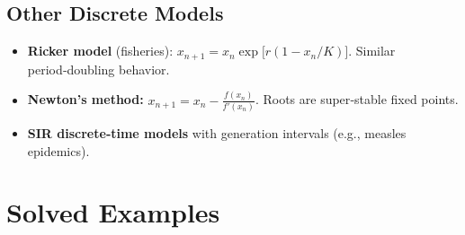 \documentclass[12pt,a4paper]{book}
\begin{document}
\subsection{Other Discrete Models}
\begin{itemize}
    \item \textbf{Ricker model} (fisheries): $x_{n+1} = x_n \exp\bigl[r(1 - x_n/K)\bigr]$. Similar period‑doubling behavior.
    \item \textbf{Newton’s method:} $x_{n+1} = x_n - \frac{f(x_n)}{f'(x_n)}$. Roots are super‑stable fixed points.
    \item \textbf{SIR discrete‑time models} with generation intervals (e.g., measles epidemics).
\end{itemize}

\section{Solved Examples}
\end{document}
